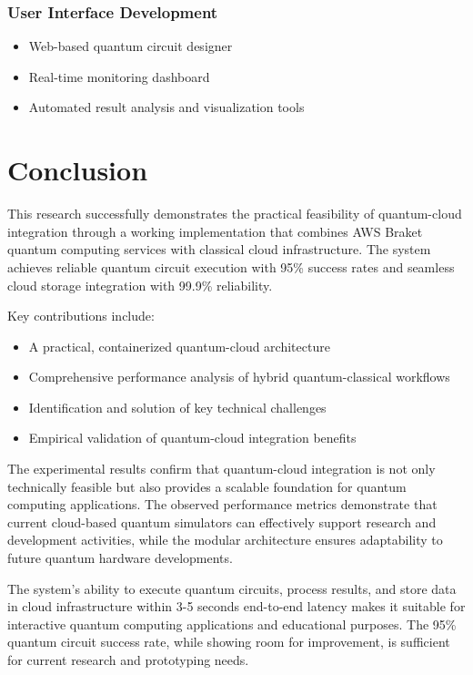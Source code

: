 \documentclass[conference]{IEEEtran}
\begin{document}
\subsubsection{User Interface Development}
\begin{itemize}
    \item Web-based quantum circuit designer
    \item Real-time monitoring dashboard
    \item Automated result analysis and visualization tools
\end{itemize}

\section{Conclusion}

This research successfully demonstrates the practical feasibility of quantum-cloud integration through a working implementation that combines AWS Braket quantum computing services with classical cloud infrastructure. The system achieves reliable quantum circuit execution with 95\% success rates and seamless cloud storage integration with 99.9\% reliability.

Key contributions include:
\begin{itemize}
    \item A practical, containerized quantum-cloud architecture
    \item Comprehensive performance analysis of hybrid quantum-classical workflows
    \item Identification and solution of key technical challenges
    \item Empirical validation of quantum-cloud integration benefits
\end{itemize}

The experimental results confirm that quantum-cloud integration is not only technically feasible but also provides a scalable foundation for quantum computing applications. The observed performance metrics demonstrate that current cloud-based quantum simulators can effectively support research and development activities, while the modular architecture ensures adaptability to future quantum hardware developments.

The system's ability to execute quantum circuits, process results, and store data in cloud infrastructure within 3-5 seconds end-to-end latency makes it suitable for interactive quantum computing applications and educational purposes. The 95\% quantum circuit success rate, while showing room for improvement, is sufficient for current research and prototyping needs.
\end{document}

